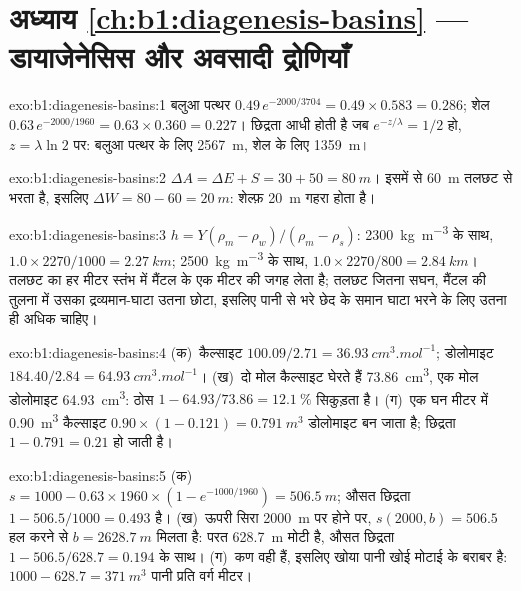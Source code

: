 \section*{अध्याय \ref{ch:b1:diagenesis-basins} --- डायाजेनेसिस और अवसादी द्रोणियाँ}

\begin{solution}{exo:b1:diagenesis-basins:1}
बलुआ पत्थर $0.49\,e^{-2000/3704} = 0.49\times0.583 = \num{0.286}$; शेल
$0.63\,e^{-2000/1960} = 0.63\times0.360 = \num{0.227}$। छिद्रता आधी होती है जब
$e^{-z/\lambda} = 1/2$ हो, $z = \lambda\ln 2$ पर: बलुआ पत्थर के लिए \qty{2567}{m},
शेल के लिए \qty{1359}{m}।
\end{solution}

\begin{solution}{exo:b1:diagenesis-basins:2}
$\Delta A = \Delta E + S = 30 + 50 = \qty{80}{m}$। इसमें से \qty{60}{m} तलछट से
भरता है, इसलिए $\Delta W = 80 - 60 = \qty{20}{m}$: शेल्फ़ \qty{20}{m} गहरा होता है।
\end{solution}

\begin{solution}{exo:b1:diagenesis-basins:3}
$h = Y(\rho_m - \rho_w)/(\rho_m - \rho_s)$: \qty{2300}{kg.m^{-3}} के साथ,
$1.0\times2270/1000 = \qty{2.27}{km}$; \qty{2500}{kg.m^{-3}} के साथ,
$1.0\times2270/800 = \qty{2.84}{km}$। तलछट का हर मीटर स्तंभ में मैंटल के एक मीटर की
जगह लेता है; तलछट जितना सघन, मैंटल की तुलना में उसका द्रव्यमान-घाटा उतना छोटा,
इसलिए पानी से भरे छेद के समान घाटा भरने के लिए उतना ही अधिक चाहिए।
\end{solution}

\begin{solution}{exo:b1:diagenesis-basins:4}
(क)~कैल्साइट $100.09/2.71 = \qty{36.93}{cm^3.mol^{-1}}$; डोलोमाइट $184.40/2.84
= \qty{64.93}{cm^3.mol^{-1}}$। (ख)~दो मोल कैल्साइट घेरते हैं \qty{73.86}{cm^3}, एक
मोल डोलोमाइट \qty{64.93}{cm^3}: ठोस $1 - 64.93/73.86 = \qty{12.1}{\%}$ सिकुड़ता है।
(ग)~एक घन मीटर में \qty{0.90}{m^3} कैल्साइट $0.90\times(1 - 0.121) = \qty{0.791}{m^3}$
डोलोमाइट बन जाता है; छिद्रता $1 - 0.791 = \num{0.21}$ हो जाती है।
\end{solution}

\begin{solution}{exo:b1:diagenesis-basins:5}
(क)~$s = 1000 - 0.63\times1960\times(1 - e^{-1000/1960}) = \qty{506.5}{m}$; औसत
छिद्रता $1 - 506.5/1000 = \num{0.493}$ है। (ख)~ऊपरी सिरा \qty{2000}{m} पर होने पर,
$s(2000, b) = 506.5$ हल करने से $b = \qty{2628.7}{m}$ मिलता है: परत
\qty{628.7}{m} मोटी है, औसत छिद्रता $1 - 506.5/628.7 = \num{0.194}$ के साथ।
(ग)~कण वही हैं, इसलिए खोया पानी खोई मोटाई के बराबर है:
$1000 - 628.7 = \qty{371}{m^3}$ पानी प्रति वर्ग मीटर।
\end{solution}

